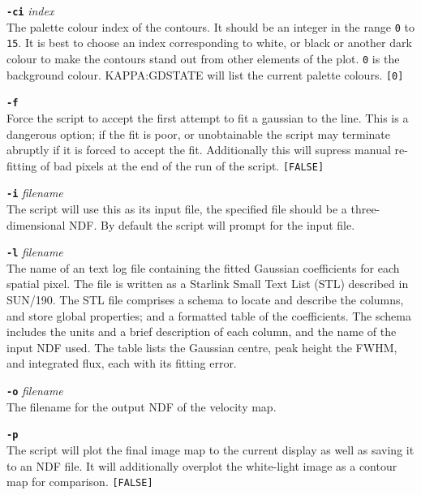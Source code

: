 \documentclass[twoside,11pt]{article}
\newcommand{\xref}[3]{#1}
\renewcommand{\_}{\texttt{\symbol{95}}}
\newcommand{\sstitem}{\item}
\begin{document}
{{{         \sstitem
         {\bf{\tt{-ci}}} {\em index}\\
           The palette colour index of the contours.  It should be an
           integer in the range {\tt 0} to {\tt 15}.  It is best to choose
           an index corresponding to white, or black or another dark colour
           to make the contours stand out from other elements of the plot.
           {\tt 0} is the background colour. \xref{KAPPA:GDSTATE}{sun95}{GDSTATE}
           will list the current palette colours.  {\tt [0]}

         \sstitem
         {\bf{\tt{-f}}}\\
           Force the script to accept the first attempt to fit a gaussian to
           the line.  This is a dangerous option; if the fit is poor, or
           unobtainable the script may terminate abruptly if it is forced to
           accept the fit.  Additionally this will supress manual re-fitting
           of bad pixels at the end of the run of the script.  {\tt [FALSE]}

         \sstitem
         {\bf{\tt{-i}}} {\em filename}\\
           The script will use this as its input file, the specified file should
           be a three-dimensional NDF.  By default the script will prompt for the
           input file.

         \sstitem
         {\bf{\tt{-l}}} {\em filename}\\
           The name of an text log file containing the fitted Gaussian
           coefficients for each spatial pixel.  The file is written as a
           Starlink Small Text List (STL) described in
           \xref{SUN/190}{sun190}).  The STL file comprises a schema to
           locate and describe the columns, and store global properties; and a
           formatted table of the coefficients.  The schema includes the units
           and a brief description of each column, and the name of the input
           NDF used.  The table lists the Gaussian centre, peak height the FWHM,
           and integrated flux, each with its fitting error.

         \sstitem
         {\bf{\tt{-o}}} {\em filename}\\
           The filename for the output NDF of the velocity map.

         \sstitem
         {\bf{\tt{-p}}}\\
           The script will plot the final image map to the current display
           as well as saving it to an NDF file.  It will additionally overplot
           the white-light image as a contour map for comparison.
           {\tt [FALSE]}

}}}
\end{document}
